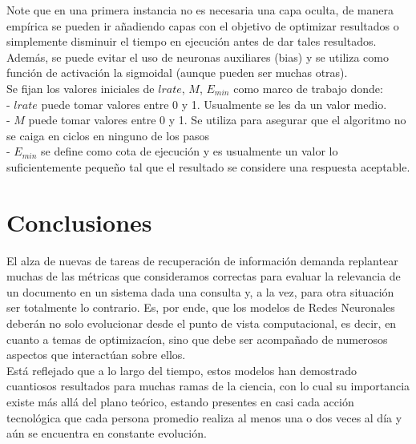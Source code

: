 \documentclass{llncs}
\begin{document}
\begin{multicols}{2}[]
Note que en una primera instancia no es necesaria una capa oculta, de manera emp\'irica se pueden ir a\~nadiendo capas con el objetivo de optimizar
resultados o simplemente disminuir el tiempo en ejecuci\'on antes de dar tales resultados. Adem\'as, se puede evitar el uso de neuronas auxiliares (bias)
y se utiliza como funci\'on de activaci\'on la sigmoidal (aunque pueden ser muchas otras). \\
Se fijan los valores iniciales de $lrate$, $M$, $E_{min}$ como marco de trabajo donde:\\
- $lrate$ puede tomar valores entre 0 y 1. Usualmente se les da un valor medio. \\
- $M$ puede tomar valores entre 0 y 1. Se utiliza para asegurar que el algoritmo no se caiga en ciclos en ninguno de los pasos\\
- $E_{min}$ se define como cota de ejecuci\'on y es usualmente un valor lo suficientemente peque\~no tal que el resultado se considere una respuesta aceptable.

\section{Conclusiones}

El alza de nuevas de tareas de recuperaci\'on de informaci\'on demanda replantear muchas de las m\'etricas que consideramos correctas para evaluar la relevancia
de un documento en un sistema dada una consulta y, a la vez, para otra situaci\'on ser totalmente lo contrario. Es, por ende, que los modelos de Redes Neuronales
deber\'an no solo evolucionar desde el punto de vista computacional, es decir, en cuanto a temas de optimizac\'ion, sino que debe ser acompa\~nado de numerosos
aspectos que interac\-t\'uan sobre ellos. \\
Est\'a reflejado que a lo largo del tiempo, estos modelos han demostrado cuantiosos resultados para muchas ramas de la ciencia, con lo cual su importancia existe
m\'as all\'a del plano te\'orico, estando presentes en casi cada acci\'on tecnol\'ogica que cada persona promedio realiza al menos una o dos veces al d\'ia y a\'un se
encuentra en constante evoluci\'on.


\end{multicols}
\end{document}
